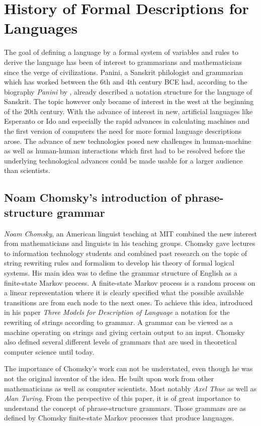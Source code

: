 \documentclass{article}
\begin{document}
\section{History of Formal Descriptions for Languages}
The goal of defining a language by a formal system of variables and rules to derive the language has been of interest to grammarians and mathematicians since the verge of civilizations. Panini, a Sanskrit philologist and grammarian which has worked between the 6th and 4th century BCE had, according to the biography \textit{Panini} by \citet{bhate2002panini}, already described a notation structure for the language of Sanskrit. The topic however only became of interest in the west at the beginning of the 20th century. With the advance of interest in new, artificial languages like Esperanto or Ido and especially the rapid advances in calculating machines and the first version of computers the need for more formal language descriptions arose. The advance of new technologies posed new challenges in human-machine as well as human-human interactions which first had to be resolved before the underlying technological advances could be made usable for a larger audience than scientists.

\subsection{Noam Chomsky's introduction of phrase-structure grammar}
\textit{Noam Chomsky}, an American linguist teaching at MIT combined the new interest from mathematicians and linguists in his teaching groups. Chomsky gave lectures to information technology students and combined past research on the topic of string rewriting rules and formalism to develop his theory of formal logical systems. His main idea was to define the grammar structure of English as a finite-state Markov process. A finite-state Markov process is a random process on a linear representation where it is clearly specified what the possible available transitions are from each node to the next ones. To achieve this idea, \citet{1056813} introduced in his paper \textit{Three Models for Description of Language} a notation for the rewriting of strings according to grammar. A grammar can be viewed as a machine operating on strings and giving certain output to an input. Chomsky also defined several different levels of grammars that are used in theoretical computer science until today.

The importance of Chomsky’s work can not be understated, even though he was not the original inventor of the idea. He built upon work from other mathematicians as well as computer scientists. Most notably \textit{Axel Thue} as well as \textit{Alan Turing}. From the perspective of this paper, it is of great importance to understand the concept of phrase-structure grammars. Those grammars are as defined by Chomsky finite-state Markov processes that produce languages.
\end{document}
